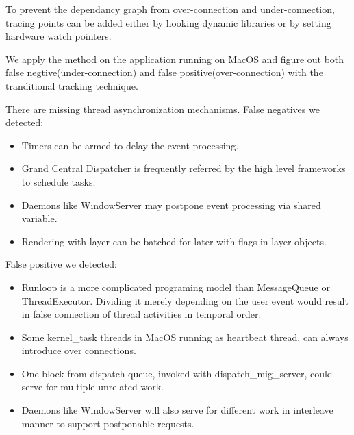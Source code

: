 To prevent the dependancy graph from over-connection and under-connection, tracing points can be added either by hooking dynamic libraries or by setting hardware watch pointers.
\par
We apply the method on the application running on MacOS and figure out both false negtive(under-connection) and false positive(over-connection) with the tranditional tracking technique.
\par
There are missing thread asynchronization mechanisms. False negatives we detected:
\begin{itemize}
\item Timers can be armed to delay the event processing.
\item Grand Central Dispatcher is frequently referred by the high level frameworks to schedule tasks.
\item Daemons like WindowServer may postpone event processing via shared variable.
\item Rendering with layer can be batched for later with flags in layer objects.
\end{itemize}
False positive we detected:
\begin{itemize}
\item Runloop is a more complicated programing model than MessageQueue or ThreadExecutor.
Dividing it merely depending on the user event would result in false connection of thread activities in temporal order.
\item Some kernel\_task threads in MacOS running as heartbeat thread, can always introduce over connections.
\item One block from dispatch queue, invoked with dispatch\_mig\_server, could serve for multiple unrelated work.
\item Daemons like WindowServer will also serve for different work in interleave manner to support postponable requests.
\end{itemize}
\par
